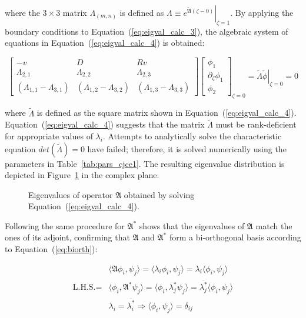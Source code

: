 where the $ 3 \times 3$ matrix $\Lambda_{(m,n)}$ is defined as $\Lambda \equiv \left. e^{\tilde{\mathfrak{A}} (\zeta - 0)} \right|_{\zeta = 1}$. By applying the boundary conditions to Equation~(\ref{eq:eigval_calc_3}), the algebraic system of equations in Equation~(\ref{eq:eigval_calc_4}) is obtained:

\begin{equation} \label{eq:eigval_calc_4}
    \begin{bmatrix}
        -v & D & Rv \\
        \Lambda_{2,1} & \Lambda_{2,2} & \Lambda_{2,3} \\
        (\Lambda_{1,1} - \Lambda_{3,1}) & (\Lambda_{1,2} - \Lambda_{3,2}) & (\Lambda_{1,3} - \Lambda_{3,3})
    \end{bmatrix} \begin{bmatrix}
        \phi_1 \\ \partial_\zeta \phi_1 \\ \phi_2
    \end{bmatrix}_{\zeta=0} = \tilde{\Lambda} \left. \tilde{{\phi}} \right|_{\zeta = 0} = 0
\end{equation}

where $\tilde{\Lambda}$ is defined as the square matrix shown in Equation~(\ref{eq:eigval_calc_4}). Equation~(\ref{eq:eigval_calc_4}) suggests that the matrix $\tilde{\Lambda}$ must be rank-deficient for appropriate values of $\lambda_i$. Attempts to analytically solve the characteristic equation $det(\tilde{\Lambda}) = 0$ have failed; therefore, it is solved numerically using the parameters in Table~\ref{tab:pars_cjce1}. The resulting eigenvalue distribution is depicted in Figure~\ref{fig:eigval_dist_cjce1} in the complex plane.

\begin{figure}[!htbp]
    \centering
    
    \caption{Eigenvalues of operator $\mathfrak{A}$ obtained by solving Equation~(\ref{eq:eigval_calc_4}).}
    \label{fig:eigval_dist_cjce1}
\end{figure}

Following the same procedure for $\mathfrak{A}^*$ shows that the eigenvalues of $\mathfrak{A}$ match the ones of its adjoint, confirming that $\mathfrak{A}$ and $\mathfrak{A}^*$ form a bi-orthogonal basis according to Equation~(\ref{eq:biorth}):

\begin{equation} \label{eq:biorth}
    \begin{aligned}
        &\langle \mathfrak{A} {\phi_i}, {\psi_j} \rangle = \langle \lambda_i {\phi_i}, {\psi_j} \rangle = \lambda_i \langle {\phi_i}, {\psi_j} \rangle \\
        \text{L.H.S.} = &\langle {\phi_i}, \mathfrak{A}^* {\psi_j} \rangle = \langle {\phi_i}, \lambda_j^* {\psi_j} \rangle = \overline{\lambda_j^*} \langle {\phi_i}, {\psi_j} \rangle \\
        &\lambda_i = \overline{\lambda_i^*} \Rightarrow \langle {\phi_i}, {\psi_j} \rangle = \delta_{ij}
    \end{aligned}
\end{equation}

